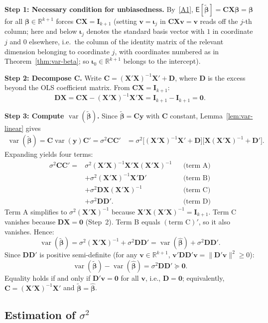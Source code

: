 \documentclass[12pt,a4paper]{article}
\makeatletter
\theoremstyle{definition}
\renewenvironment{proof}[1][\proofname]{\par
  \pushQED{\qed}%
  \normalfont \topsep6\p@\@plus6\p@\relax
  \trivlist
  \item[\hskip\labelsep\bfseries #1\@addpunct{.}]\ignorespaces
}{%
  \popQED\endtrivlist\@endpefalse
}
\newcommand\expc{\mathsf{E}}
\DeclareMathOperator\var{var}
\newcommand{\bX}{\mathbf{X}}
\newcommand{\by}{\mathbf{y}}
\def\bb{\boldsymbol{\beta}}
\newcommand{\bI}{\mathbf{I}}
\newcommand{\bzero}{\mathbf{0}}
\newcommand{\bC}{\mathbf{C}}
\newcommand{\bD}{\mathbf{D}}
\newcommand{\bv}{\mathbf{v}}
\newcommand{\Real}{\mathbb{R}}
\makeatother
\begin{document}
\begin{proof}
\textbf{Step 1: Necessary condition for unbiasedness.} By~\ref{A1}, $\expc[\tilde{\bb}] = \bC\bX\bb = \bb$ for all $\bb \in \Real^{k+1}$ forces $\bC\bX = \bI_{k+1}$ (setting $\bv = \boldsymbol\iota_j$ in $\bC\bX\bv = \bv$ reads off the $j$-th column; here and below $\boldsymbol\iota_j$ denotes the standard basis vector with $1$ in coordinate $j$ and $0$ elsewhere, i.e.\ the column of the identity matrix of the relevant dimension belonging to coordinate $j$, with coordinates numbered as in Theorem~\ref{thm:var-beta}; so $\boldsymbol\iota_0 \in \Real^{k+1}$ belongs to the intercept).

\textbf{Step 2: Decompose $\bC$.} Write $\bC = (\bX'\bX)^{-1}\bX' + \bD$, where $\bD$ is the excess beyond the OLS coefficient matrix. From $\bC\bX = \bI_{k+1}$:
\[
\bD\bX = \bC\bX - (\bX'\bX)^{-1}\bX'\bX = \bI_{k+1} - \bI_{k+1} = \bzero.
\]

\textbf{Step 3: Compute $\var(\tilde{\bb})$.} Since $\tilde{\bb} = \bC\by$ with $\bC$ constant, Lemma~\ref{lem:var-linear} gives
\begin{align*}
\var(\tilde{\bb}) = \bC\var(\by)\bC' = \sigma^2\bC\bC' &= \sigma^2\bigl[(\bX'\bX)^{-1}\bX' + \bD\bigr]\bigl[\bX(\bX'\bX)^{-1} + \bD'\bigr].
\end{align*}
Expanding yields four terms:
\begin{align*}
\sigma^2\bC\bC' ={}& \sigma^2(\bX'\bX)^{-1}\bX'\bX(\bX'\bX)^{-1} && \text{(term A)}\\
& + \sigma^2(\bX'\bX)^{-1}\bX'\bD' && \text{(term B)}\\
& + \sigma^2\bD\bX(\bX'\bX)^{-1} && \text{(term C)}\\
& + \sigma^2\bD\bD'. && \text{(term D)}
\end{align*}
Term A simplifies to $\sigma^2(\bX'\bX)^{-1}$ because $\bX'\bX(\bX'\bX)^{-1} = \bI_{k+1}$. Term C vanishes because $\bD\bX = \bzero$ (Step~2). Term B equals $(\text{term C})'$, so it also vanishes. Hence:
\[
\var(\tilde{\bb}) = \sigma^2(\bX'\bX)^{-1} + \sigma^2\bD\bD' = \var(\hat{\bb}) + \sigma^2\bD\bD'.
\]
Since $\bD\bD'$ is positive semi-definite (for any $\bv \in \Real^{k+1}$, $\bv'\bD\bD'\bv = \|\bD'\bv\|^2 \geqslant 0$):
\[
\var(\tilde{\bb}) - \var(\hat{\bb}) = \sigma^2\bD\bD' \succeq \bzero.
\]
Equality holds if and only if $\bD'\bv = \bzero$ for all $\bv$, i.e., $\bD = \bzero$; equivalently, $\bC = (\bX'\bX)^{-1}\bX'$ and $\tilde{\bb} = \hat{\bb}$.
\end{proof}

\subsection{Estimation of \texorpdfstring{$\sigma^2$}{sigma\texttwosuperior}}
\end{document}

